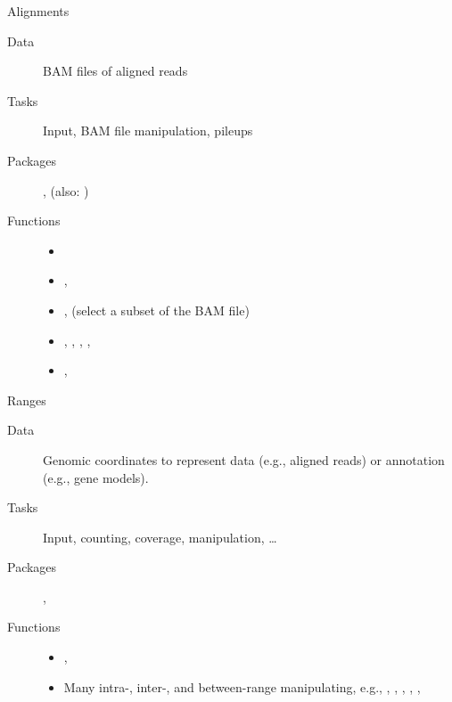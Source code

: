 \documentclass[xcolor=dvipsnames]{beamer}\usepackage[]{graphicx}\usepackage[]{color}
\begin{document}
\begin{frame}{Alignments}
  \begin{description}
  \item[Data] BAM files of aligned reads
  \item[Tasks] Input, BAM file manipulation, pileups
  \item[Packages] , 
    (also: )
  \item[Functions]
    \begin{itemize}
    \item {}
    \item {}, 
    \item {},  (select a
      subset of the BAM file)
    \item {}, ,
      , ,
    \item {}, 
    \end{itemize}
  \end{description}
\end{frame}

\begin{frame}{Ranges}
  \begin{description}
  \item[Data] Genomic coordinates to represent data (e.g., aligned
    reads) or annotation (e.g., gene models).
  \item[Tasks] Input, counting, coverage, manipulation, \ldots
  \item[Packages] , 
  \item[Functions]
    \begin{itemize}
    \item {}, 
    \item Many intra-, inter-, and between-range manipulating, e.g.,
      , , ,
      , ,
    \end{itemize}
  \end{description}
\end{frame}
\end{document}
